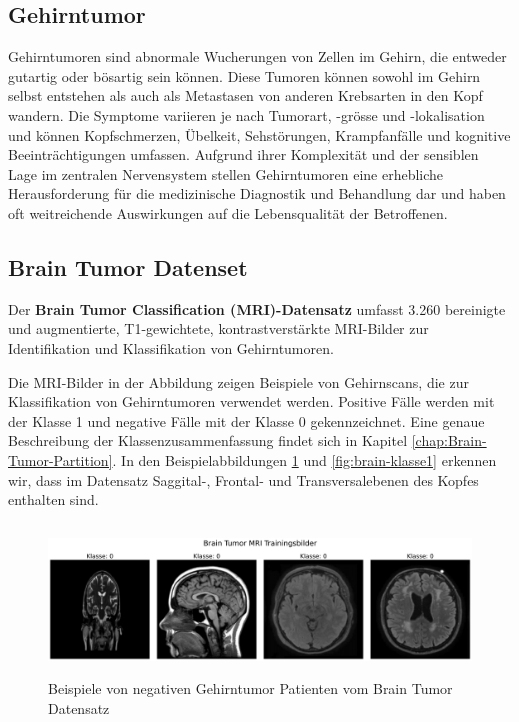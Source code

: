 \subsection{Gehirntumor} \label{chap:Gehirntumor}

Gehirntumoren sind abnormale Wucherungen von Zellen im Gehirn, die entweder gutartig oder bösartig sein können. Diese Tumoren können sowohl im Gehirn selbst entstehen als auch als Metastasen von anderen Krebsarten in den Kopf wandern. Die Symptome variieren je nach Tumorart, -grösse und -lokalisation und können Kopfschmerzen, Übelkeit, Sehstörungen, Krampfanfälle und kognitive Beeinträchtigungen umfassen. Aufgrund ihrer Komplexität und der sensiblen Lage im zentralen Nervensystem stellen Gehirntumoren eine erhebliche Herausforderung für die medizinische Diagnostik und Behandlung dar und haben oft weitreichende Auswirkungen auf die Lebensqualität der Betroffenen.


\subsection{Brain Tumor Datenset} \label{chap:Brain-Tumor}
Der \textbf{Brain Tumor Classification (MRI)-Datensatz} \cite{bhuvaji_brain_2020} umfasst 3.260 bereinigte und augmentierte, T1-gewichtete, kontrastverstärkte MRI-Bilder zur Identifikation und Klassifikation von Gehirntumoren. 

Die MRI-Bilder in der Abbildung zeigen Beispiele von Gehirnscans, die zur Klassifikation von Gehirntumoren verwendet werden. Positive Fälle werden mit der Klasse 1 und negative Fälle mit der Klasse 0 gekennzeichnet. Eine genaue Beschreibung der Klassenzusammenfassung findet sich in Kapitel \ref{chap:Brain-Tumor-Partition}. In den Beispielabbildungen \ref{fig:brain-klasse0} und \ref{fig:brain-klasse1} erkennen wir, dass im Datensatz Saggital-, Frontal- und Transversalebenen des Kopfes enthalten sind.

\begin{figure}[ht]
    \centering
    \includegraphics[width=\linewidth, height=4cm]{01-images/03-data/brain-klasse0.png}
    \caption{Beispiele von negativen Gehirntumor Patienten vom Brain Tumor Datensatz}
    \label{fig:brain-klasse0}
\end{figure}

